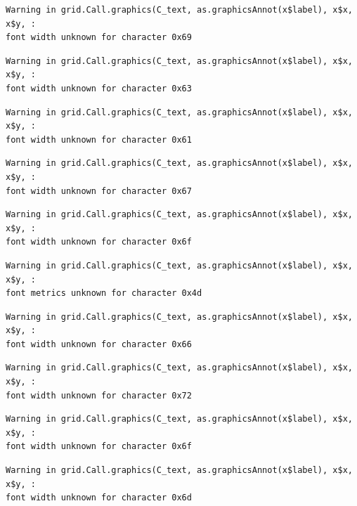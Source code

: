 \documentclass[
  letterpaper,
  DIV=11,
  numbers=noendperiod]{scrreprt}
\begin{document}
\begin{verbatim}
Warning in grid.Call.graphics(C_text, as.graphicsAnnot(x$label), x$x, x$y, :
font width unknown for character 0x69
\end{verbatim}

\begin{verbatim}
Warning in grid.Call.graphics(C_text, as.graphicsAnnot(x$label), x$x, x$y, :
font width unknown for character 0x63
\end{verbatim}

\begin{verbatim}
Warning in grid.Call.graphics(C_text, as.graphicsAnnot(x$label), x$x, x$y, :
font width unknown for character 0x61
\end{verbatim}

\begin{verbatim}
Warning in grid.Call.graphics(C_text, as.graphicsAnnot(x$label), x$x, x$y, :
font width unknown for character 0x67
\end{verbatim}

\begin{verbatim}
Warning in grid.Call.graphics(C_text, as.graphicsAnnot(x$label), x$x, x$y, :
font width unknown for character 0x6f
\end{verbatim}

\begin{verbatim}
Warning in grid.Call.graphics(C_text, as.graphicsAnnot(x$label), x$x, x$y, :
font metrics unknown for character 0x4d
\end{verbatim}

\begin{verbatim}
Warning in grid.Call.graphics(C_text, as.graphicsAnnot(x$label), x$x, x$y, :
font width unknown for character 0x66
\end{verbatim}

\begin{verbatim}
Warning in grid.Call.graphics(C_text, as.graphicsAnnot(x$label), x$x, x$y, :
font width unknown for character 0x72
\end{verbatim}

\begin{verbatim}
Warning in grid.Call.graphics(C_text, as.graphicsAnnot(x$label), x$x, x$y, :
font width unknown for character 0x6f
\end{verbatim}

\begin{verbatim}
Warning in grid.Call.graphics(C_text, as.graphicsAnnot(x$label), x$x, x$y, :
font width unknown for character 0x6d
\end{verbatim}
\end{document}
